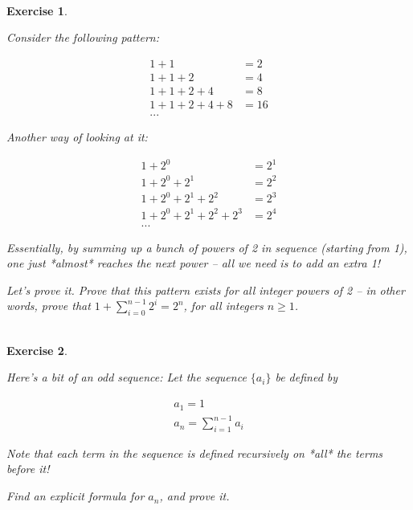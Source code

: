 \documentclass{article}
\newtheorem{exercise}{\\ \bf Exercise}
\begin{document}
\begin{exercise}
\label{power-2-sum}

Consider the following pattern:

\begin{align*}
1 + 1 &= 2 \\
1 + 1 + 2 &= 4 \\
1 + 1 + 2 + 4 &= 8 \\
1 + 1 + 2 + 4 + 8 &= 16 \\
...
\end{align*}


Another way of looking at it:

\begin{align*}
1 + 2^0 &= 2^1 \\
1 + 2^0 + 2^1 &= 2^2 \\
1 + 2^0 + 2^1 + 2^2 &= 2^3 \\
1 + 2^0 + 2^1 + 2^2 + 2^3 &= 2^4 \\
...
\end{align*}


Essentially, by summing up a bunch of powers of 2 in sequence (starting from 1), one just *almost* reaches the next power -- all we need is to add an extra 1!


Let's prove it. Prove that this pattern exists for all integer powers of 2 -- in other words, prove that $1 + \sum_{i=0}^{n-1} 2^i = 2^n$, for all integers $n \geq 1$.

\end{exercise}

\begin{exercise}
\label{sequence-recursive-sum}

Here's a bit of an odd sequence: Let the sequence $\{a_i\}$ be defined by

\begin{align*}
a_1 = 1 \\
a_{n} = \sum_{i=1}^{n-1} a_i
\end{align*}

Note that each term in the sequence is defined recursively on *all* the terms before it!

Find an explicit formula for $a_n$, and prove it. 



\end{exercise}
\end{document}
